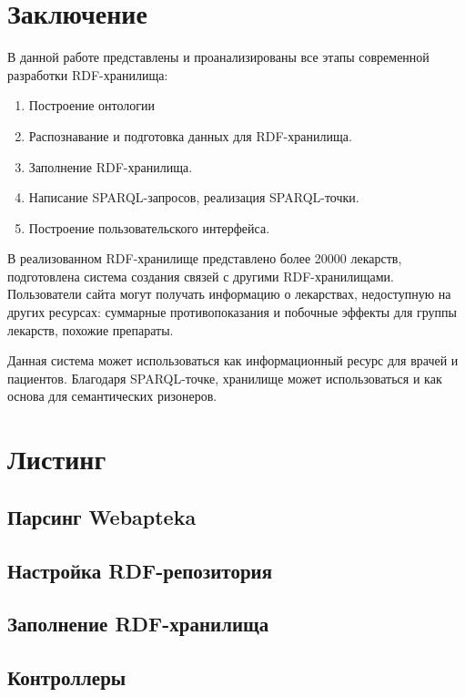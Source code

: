\documentclass[specialist,subf,href,colorlinks=true
]{disser}
\begin{document}
\chapter*{Заключение}
В данной работе представлены и проанализированы все этапы современной разработки RDF-хранилища:
\begin{enumerate}
 \item Построение онтологии
 \item Распознавание и подготовка данных для RDF-хранилища.
 \item Заполнение RDF-хранилища.
 \item Написание SPARQL-запросов, реализация SPARQL-точки.
 \item Построение пользовательского интерфейса.
\end{enumerate}
В реализованном RDF-хранилище представлено более 20000 лекарств, подготовлена система создания связей с другими RDF-хранилищами. Пользователи сайта могут получать информацию о лекарствах, недоступную на других ресурсах: суммарные противопоказания и побочные эффекты для группы лекарств, похожие препараты.

Данная система может использоваться как информационный ресурс для врачей и пациентов. Благодаря SPARQL-точке, хранилище может использоваться и как основа для семантических ризонеров.

\chapter*{Листинг}
\section*{Парсинг Webapteka}

\section*{Настройка RDF-репозитория}

\section*{Заполнение RDF-хранилища}

\section*{Контроллеры}
\end{document}
